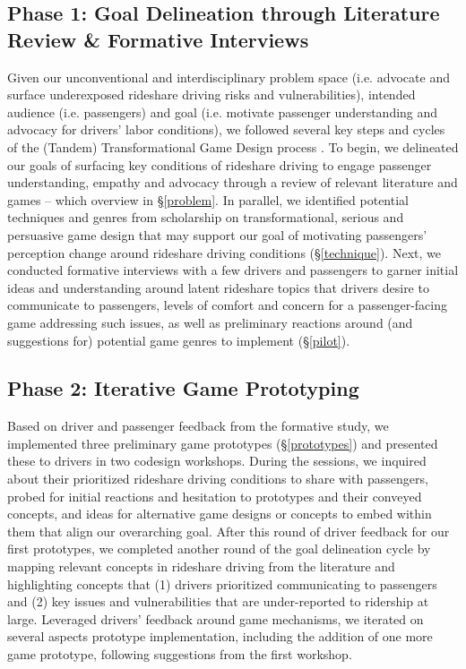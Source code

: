 \subsection{Phase 1: Goal Delineation through Literature Review \& Formative Interviews }
Given our unconventional and interdisciplinary problem space (i.e. advocate and surface underexposed rideshare driving risks and vulnerabilities), intended audience (i.e. passengers) and goal (i.e. motivate passenger understanding and advocacy for drivers' labor conditions), we followed several key steps and cycles of the (Tandem) Transformational Game Design process \cite{tandem, transformational}. 
To begin, we delineated our goals of surfacing key conditions of rideshare driving to engage passenger understanding, empathy and advocacy through a review of relevant literature and games -- which overview in \S\ref{problem}. In parallel, we identified potential techniques and genres from scholarship on transformational, serious and persuasive game design that may support our goal of motivating passengers' perception change around rideshare driving conditions (\S\ref{technique}). Next, we conducted formative interviews with a few drivers and passengers to garner initial ideas and understanding around latent rideshare topics that drivers desire to communicate to passengers, levels of comfort and concern for a passenger-facing game addressing such issues, as well as preliminary reactions around (and suggestions for) potential game genres to implement (\S\ref{pilot}).

\subsection{Phase 2: Iterative Game Prototyping}
Based on driver and passenger feedback from the formative study, we implemented three preliminary game prototypes (\S\ref{prototypes}) and presented these to drivers in two codesign workshops. During the sessions, we inquired about their prioritized rideshare driving conditions to share with passengers, probed for initial reactions and hesitation to prototypes and their conveyed concepts, and ideas for alternative game designs or concepts to embed within them that align our overarching goal. After this round of driver feedback for our first prototypes, we completed another round of the goal delineation cycle \cite{tandem} by mapping relevant concepts in rideshare driving from the literature 
and highlighting concepts that (1) drivers prioritized communicating to passengers and (2) key issues and vulnerabilities that are under-reported to ridership at large. Leveraged drivers' feedback around game mechanisms, we iterated on several aspects prototype implementation, including the addition of one more game prototype, following suggestions from the first workshop.  

